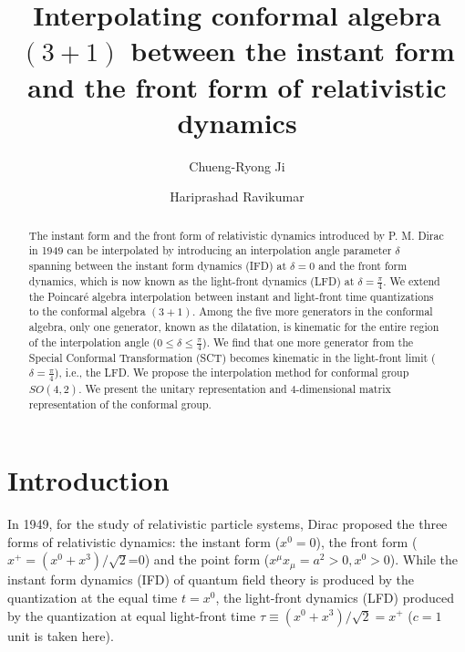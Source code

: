 \documentclass[aps,reprint,notitlepage,nofootinbib,superscriptaddress]{revtex4-1}
\begin{document}
\title{Interpolating conformal algebra \texorpdfstring{$(3+1)$}{Lg}  between the instant form
and the front form of relativistic dynamics}
\author{Chueng-Ryong Ji}
\author{Hariprashad Ravikumar}

\begin{abstract}
The instant form and the front form of relativistic dynamics introduced by P. M. Dirac \cite{Dirac1949} in 1949 can be interpolated by introducing an interpolation angle parameter $\delta$ spanning between the instant form dynamics (IFD) at $\delta=0$ and the front form dynamics, which is now known as the light-front dynamics (LFD) at $\delta=\frac{\pi}{4}$. We extend the Poincar\'e algebra \cite{Ji2001} interpolation between instant and light-front time quantizations to the conformal algebra $(3+1)$. Among the five more generators in the conformal algebra, only one generator, known as the dilatation, is kinematic for the entire region of the interpolation angle ($0\leq\delta\leq\frac{\pi}{4}$). We find that one more generator from the Special Conformal Transformation (SCT) becomes kinematic in the light-front limit ($\delta=\frac{\pi}{4}$), i.e., the LFD. We propose the interpolation method for conformal group $SO(4,2)$. We present the unitary representation and 4-dimensional matrix representation of the conformal group.
\end{abstract}

\maketitle

\section{Introduction}
\label{sec:introduction}

In 1949, for the study of relativistic particle systems, Dirac \cite{Dirac1949} proposed the three forms of relativistic dynamics: the instant form ($x^{0}=0$), the front form ($x^{+}=(x^{0}+x^{3})/\sqrt{2}$=0) and the point form ($x^{\mu}x_{\mu}=a^{2}>0, x^{0}>0$).
While the instant form dynamics (IFD) of quantum field theory is produced by the quantization at the equal time $t=x^{0}$, the light-front dynamics (LFD) produced by the quantization at equal light-front time $\tau \equiv (x^{0}+x^{3})/\sqrt{2}=x^{+}$ ($c=1$ unit is taken here).
\end{document}
